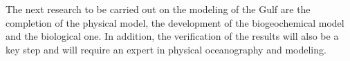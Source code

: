 \documentclass[english]{PFeENSTA}
\begin{document}

The next research to be carried out on the modeling of the Gulf are the completion of the physical model, the development of the biogeochemical model and the biological one. In addition, the verification of the results will also be a key step and will require an expert in physical oceanography and modeling. 





%



\listoffigures
\listoftables

\printindex
\printglossaries
\end{document}
